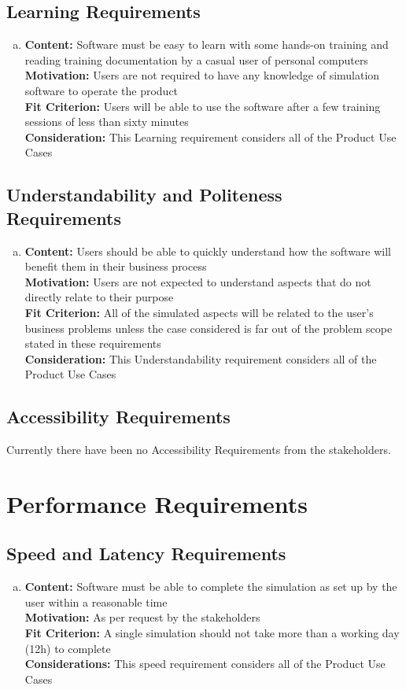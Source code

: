 \documentclass[paper=letter, fontsize=10pt]{scrartcl}
\numberwithin{equation}{section}		%
\numberwithin{figure}{section}			%
\numberwithin{table}{section}				%
\begin{document}
\subsection{Learning Requirements}
\begin{enumerate}[(a)]
	\item \textbf{Content:} Software must be easy to learn with some hands-on training and reading training documentation by a casual user of personal computers
	\\	  \textbf{Motivation:} Users are not required to have any knowledge of simulation software to operate the product
	\\	  \textbf{Fit Criterion:} Users will be able to use the software after a few training sessions of less than sixty minutes
	\\	  \textbf{Consideration:} This Learning requirement considers all of the Product Use Cases
\end{enumerate}
\subsection{Understandability and Politeness Requirements}
\begin{enumerate}[(a)]
	\item \textbf{Content:} Users should be able to quickly understand how the software will benefit them in their business process
	\\	  \textbf{Motivation:} Users are not expected to understand aspects that do not directly relate to their purpose
	\\	  \textbf{Fit Criterion:} All of the simulated aspects will be related to the user's business problems unless the case considered is far out of the problem scope stated in these requirements
	\\	  \textbf{Consideration:} This Understandability requirement considers all of the Product Use Cases	
\end{enumerate}
\subsection{Accessibility Requirements}
Currently there have been no Accessibility Requirements from the stakeholders.

\section{Performance Requirements}
\subsection{Speed and Latency Requirements}
\begin{enumerate}[(a)]
	\item \textbf{Content:} Software must be able to complete the simulation as set up by the user within a reasonable time
	\\	  \textbf{Motivation:} As per request by the stakeholders
	\\	  \textbf{Fit Criterion:} A single simulation should not take more than a working day (12h) to complete
	\\	  \textbf{Considerations:} This speed requirement considers all of the Product Use Cases
\end{enumerate}
\end{document}
